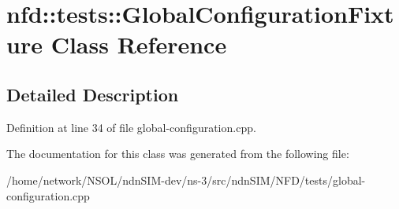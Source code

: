 \hypertarget{classnfd_1_1tests_1_1GlobalConfigurationFixture}{}\section{nfd\+:\+:tests\+:\+:Global\+Configuration\+Fixture Class Reference}
\label{classnfd_1_1tests_1_1GlobalConfigurationFixture}


\subsection{Detailed Description}


Definition at line 34 of file global-\/configuration.\+cpp.



The documentation for this class was generated from the following file\+:\begin{DoxyCompactItemize}
\item 
/home/network/\+N\+S\+O\+L/ndn\+S\+I\+M-\/dev/ns-\/3/src/ndn\+S\+I\+M/\+N\+F\+D/tests/global-\/configuration.\+cpp\end{DoxyCompactItemize}
